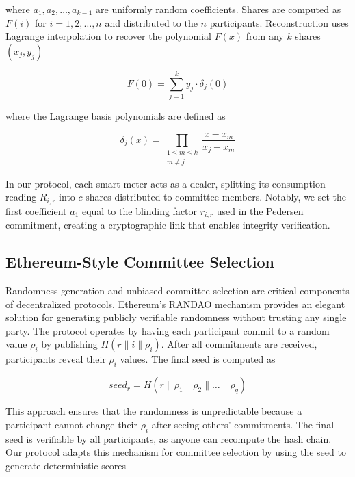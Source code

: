 \documentclass[conference]{IEEEtran}
\begin{document}
where $a_1, a_2, \ldots, a_{k-1}$ are uniformly random coefficients. Shares are computed as $F(i)$ for $i = 1, 2, \ldots, n$ and distributed to the $n$ participants. Reconstruction uses Lagrange interpolation to recover the polynomial $F(x)$ from any $k$ shares $(x_j, y_j)$

\begin{equation}
F(0) = \sum_{j=1}^{k} y_j \cdot \delta_j(0)
\end{equation}

where the Lagrange basis polynomials are defined as

\begin{equation}
\delta_j(x) = \prod_{\substack{1 \leq m \leq k \\ m \neq j}} \frac{x - x_m}{x_j - x_m}
\end{equation}

In our protocol, each smart meter acts as a dealer, splitting its consumption reading $R_{i,r}$ into $c$ shares distributed to committee members. Notably, we set the first coefficient $a_1$ equal to the blinding factor $r_{i,r}$ used in the Pedersen commitment, creating a cryptographic link that enables integrity verification.

\subsection{Ethereum-Style Committee Selection}

Randomness generation and unbiased committee selection are critical components of decentralized protocols. Ethereum's RANDAO mechanism provides an elegant solution for generating publicly verifiable randomness without trusting any single party. The protocol operates by having each participant commit to a random value $\rho_i$ by publishing $H(r \parallel i \parallel \rho_i)$. After all commitments are received, participants reveal their $\rho_i$ values. The final seed is computed as

\begin{equation}
\mathit{seed}_r = H(r \parallel \rho_1 \parallel \rho_2 \parallel \ldots \parallel \rho_q)
\end{equation}

This approach ensures that the randomness is unpredictable because a participant cannot change their $\rho_i$ after seeing others' commitments. The final seed is verifiable by all participants, as anyone can recompute the hash chain. Our protocol adapts this mechanism for committee selection by using the seed to generate deterministic scores
\end{document}
